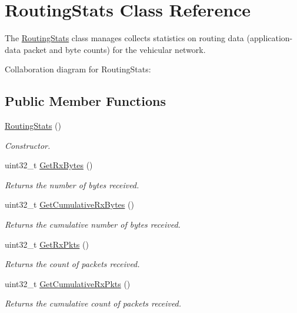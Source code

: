 \hypertarget{classRoutingStats}{}\section{Routing\+Stats Class Reference}
\label{classRoutingStats}


The \hyperlink{classRoutingStats}{Routing\+Stats} class manages collects statistics on routing data (application-\/data packet and byte counts) for the vehicular network.  




Collaboration diagram for Routing\+Stats\+:
\subsection*{Public Member Functions}
\begin{DoxyCompactItemize}
\item 
\hyperlink{classRoutingStats_a7ccc1fa8a9f94a6f13ad804982d67383}{Routing\+Stats} ()
\begin{DoxyCompactList}\small\item\em Constructor. \end{DoxyCompactList}\item 
uint32\+\_\+t \hyperlink{classRoutingStats_a96e1a38d5ecfffeb666c54c4b86bfb73}{Get\+Rx\+Bytes} ()
\begin{DoxyCompactList}\small\item\em Returns the number of bytes received. \end{DoxyCompactList}\item 
uint32\+\_\+t \hyperlink{classRoutingStats_ad8f272c14a4f74f764169f30455ace65}{Get\+Cumulative\+Rx\+Bytes} ()
\begin{DoxyCompactList}\small\item\em Returns the cumulative number of bytes received. \end{DoxyCompactList}\item 
uint32\+\_\+t \hyperlink{classRoutingStats_ab46561e6214877d39a718fc55f06231b}{Get\+Rx\+Pkts} ()
\begin{DoxyCompactList}\small\item\em Returns the count of packets received. \end{DoxyCompactList}\item 
uint32\+\_\+t \hyperlink{classRoutingStats_ac51258b09be3257f1c019eb317a9388a}{Get\+Cumulative\+Rx\+Pkts} ()
\begin{DoxyCompactList}\small\item\em Returns the cumulative count of packets received. \end{DoxyCompactList}\item 

\end{DoxyCompactItemize}
